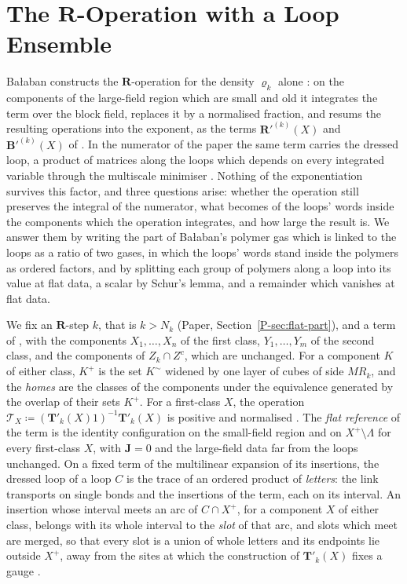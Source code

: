 \documentclass[11pt]{preprint}
\numberwithin{equation}{section}
\theoremstyle{definition}
\theoremstyle{remark}
\theoremstyle{plain}
\begin{document}
\section{The \texorpdfstring{$\mathbf R$}{R}-Operation with a Loop Ensemble}\label{sec:r-operation}

Ba{\l}aban constructs the $\mathbf R$-operation for the density $\varrho_k$ alone \cite[Sect.~1]{BalabanLFR1} \cite[pp.~377--391]{BalabanLFR2}: on the components of the large-field region which are small and old it integrates the term over the block field, replaces it by a normalised fraction, and resums the resulting operations into the exponent, as the terms $\mathbf R'^{(k)}(X)$ and $\mathbf B'^{(k)}(X)$ of \cite[(1.98)--(1.101), p.~390]{BalabanLFR2}. In the numerator of the paper the same term carries the dressed loop, a product of matrices along the loops which depends on every integrated variable through the multiscale minimiser \cite[(2.12), p.~256]{BalabanCRE}. Nothing of the exponentiation survives this factor, and three questions arise: whether the operation still preserves the integral of the numerator, what becomes of the loops' words inside the components which the operation integrates, and how large the result is. We answer them by writing the part of Ba{\l}aban's polymer gas which is linked to the loops as a ratio of two gases, in which the loops' words stand inside the polymers as ordered factors, and by splitting each group of polymers along a loop into its value at flat data, a scalar by Schur's lemma, and a remainder which vanishes at flat data.

We fix an $\mathbf R$-step $k$, that is $k > N_k$ (Paper, Section~\ref{P-sec:flat-part}), and a term of \cite[(1.72), p.~379]{BalabanLFR2}, with the components $X_1, \dots, X_n$ of the first class, $Y_1, \dots, Y_m$ of the second class, and the components of $Z_k \cap Z^c$, which are unchanged. For a component $K$ of either class, $K^+$ is the set $K^\sim$ \cite[p.~377]{BalabanLFR2} widened by one layer of cubes of side $MR_k$, and the \emph{homes} are the classes of the components under the equivalence generated by the overlap of their sets $K^+$. For a first-class $X$, the operation $\mathcal T_X \coloneqq (\mathbf T'_k(X)1)^{-1}\mathbf T'_k(X)$ is positive \cite[p.~380]{BalabanLFR2} and normalised \cite[p.~391]{BalabanLFR2}. The \emph{flat reference} of the term is the identity configuration on the small-field region and on $X^+ \setminus \Lambda$ for every first-class $X$, with $\mathbf J = 0$ and the large-field data far from the loops unchanged. On a fixed term of the multilinear expansion of its insertions, the dressed loop of a loop $C$ is the trace of an ordered product of \emph{letters}: the link transports on single bonds and the insertions of the term, each on its interval. An insertion whose interval meets an arc of $C \cap X^+$, for a component $X$ of either class, belongs with its whole interval to the \emph{slot} of that arc, and slots which meet are merged, so that every slot is a union of whole letters and its endpoints lie outside $X^+$, away from the sites at which the construction of $\mathbf T'_k(X)$ fixes a gauge \cite[pp.~195--196]{BalabanLFR1}.
\end{document}

